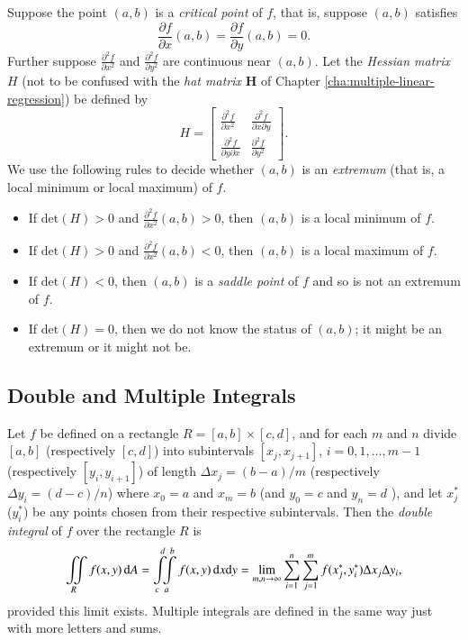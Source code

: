 \documentclass[captions=tableheading]{scrbook}
\begin{document}
Suppose the point $(a,b)$ is a \emph{critical point} of $f$, that is, suppose $(a,b)$ satisfies 
\begin{equation}
\frac{\partial f}{\partial x}(a,b)=\frac{\partial f}{\partial y}(a,b)=0.
\end{equation}
Further suppose $\frac{\partial^{2}f}{\partial x^{2}}$ and $\frac{\partial^{2}f}{\partial y^{2}}$ are continuous near $(a,b)$. Let the \emph{Hessian matrix} $H$ (not to be confused with the \emph{hat matrix} $\mathbf{H}$ of Chapter \ref{cha:multiple-linear-regression}) be defined by
\begin{equation}
H = 
\begin{bmatrix}
\frac{\partial^{2}f}{\partial x^{2}} & \frac{\partial^{2}f}{\partial x\partial y}\\
\frac{\partial^{2}f}{\partial y\partial x} & \frac{\partial^{2}f}{\partial y^{2}}
\end{bmatrix}.
\end{equation}
We use the following rules to decide whether $(a,b)$ is an \emph{extremum} (that is, a local minimum or local maximum) of $f$.
\begin{itemize}
\item If $\mbox{det}(H)>0$ and $\frac{\partial^{2}f}{\partial x^{2}}(a,b)>0$, then $(a,b)$ is a local minimum of $f$.
\item If $\mbox{det}(H)>0$ and $\frac{\partial^{2}f}{\partial x^{2}}(a,b)<0$, then $(a,b)$ is a local maximum of $f$.
\item If $\mbox{det}(H)<0$, then $(a,b)$ is a \emph{saddle point} of $f$ and so is not an extremum of $f$.
\item If $\mbox{det}(H)=0$, then we do not know the status of $(a,b)$; it might be an extremum or it might not be.
\end{itemize}
\subsection{Double and Multiple Integrals}
\label{sec-6-6-3}

Let $f$ be defined on a rectangle $R=[a,b]\times[c,d]$, and for each $m$ and $n$ divide $[a,b]$ (respectively $[c,d]$) into subintervals $[x_{j},x_{j+1}]$, $i=0,1,\ldots,m-1$ (respectively $[y_{i},y_{i+1}]$) of length $\Delta x_{j}=(b-a)/m$ (respectively $\Delta y_{i}=(d-c)/n$) where $x_{0}=a$ and $x_{m}=b$ (and $y_{0}=c$ and $y_{n}=d$ ), and let $x_{j}^{\ast}$ ($y_{i}^{\ast}$) be any points chosen from their respective subintervals. Then the \emph{double integral} of $f$ over the rectangle $R$ is
\begin{equation}
\iintop_{R}f(x,y)\,\mathrm{d} A=\intop_{c}^{d}\!\!\!\intop_{a}^{b}f(x,y)\,\mathrm{d} x\mathrm{d} y=\lim_{m,n\to\infty}\sum_{i=1}^{n}\sum_{j=1}^{m}f(x_{j}^{\ast},y_{i}^{\ast})\Delta x_{j}\Delta y_{i},
\end{equation}
provided this limit exists. Multiple integrals are defined in the same way just with more letters and sums.
\end{document}
